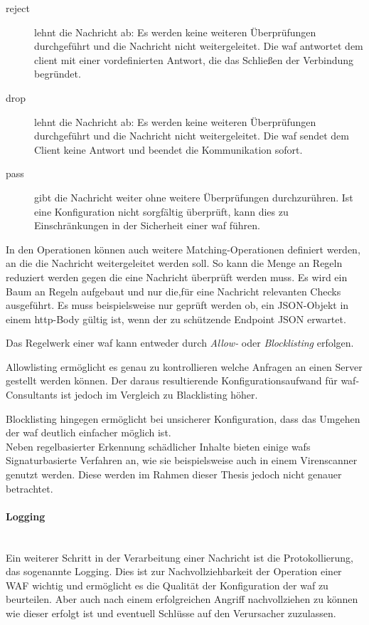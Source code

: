 \begin{description}
    \item[reject] lehnt die Nachricht ab: Es werden keine weiteren Überprüfungen durchgeführt und die Nachricht nicht weitergeleitet.
    Die \ac{waf} antwortet dem client mit einer vordefinierten Antwort, die das Schließen der Verbindung begründet.
    \item[drop] lehnt die Nachricht ab: Es werden keine weiteren Überprüfungen durchgeführt und die Nachricht nicht weitergeleitet.
    Die \ac{waf} sendet dem Client keine Antwort und beendet die Kommunikation sofort.
    \item[pass] gibt die Nachricht weiter ohne weitere Überprüfungen durchzurühren.
    Ist eine Konfiguration nicht sorgfältig überprüft, kann dies zu Einschränkungen in der Sicherheit einer \ac{waf} führen.
\end{description}

In den Operationen können auch weitere Matching-Operationen definiert werden, an die die Nachricht weitergeleitet werden soll.
So kann die Menge an Regeln reduziert werden gegen die eine Nachricht überprüft werden muss.
Es wird ein Baum an Regeln aufgebaut und nur die,für eine Nachricht relevanten Checks ausgeführt.
Es muss beispielsweise nur geprüft werden ob, ein JSON-Objekt in einem \ac{http}-Body gültig ist, wenn der zu schützende Endpoint JSON erwartet.

Das Regelwerk einer \ac{waf} kann entweder durch \textit{Allow-} oder \textit{Blocklisting} erfolgen.

Allowlisting ermöglicht es genau zu kontrollieren welche Anfragen an einen Server gestellt werden können.
Der daraus resultierende Konfigurationsaufwand für \ac{waf}-Consultants ist jedoch im Vergleich zu Blacklisting höher.

Blocklisting hingegen ermöglicht bei unsicherer Konfiguration, dass das Umgehen der \ac{waf} deutlich einfacher möglich ist.\\

Neben regelbasierter Erkennung schädlicher Inhalte bieten einige \acp{waf} Signaturbasierte Verfahren an, wie sie beispielsweise auch in einem Virenscanner genutzt werden.
Diese werden im Rahmen dieser Thesis jedoch nicht genauer betrachtet.

\paragraph{Logging}\ \\
Ein weiterer Schritt in der Verarbeitung einer Nachricht ist die Protokollierung, das sogenannte Logging.
Dies ist zur Nachvollziehbarkeit der Operation einer WAF wichtig und ermöglicht es die Qualität der Konfiguration der \ac{waf} zu beurteilen.
Aber auch nach einem erfolgreichen Angriff nachvollziehen zu können wie dieser erfolgt ist und eventuell Schlüsse auf den Verursacher zuzulassen.

